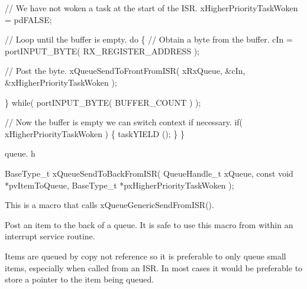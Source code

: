 \begin{DoxyPre}   // We have not woken a task at the start of the ISR.
   xHigherPriorityTaskWoken = pdFALSE;\end{DoxyPre}



\begin{DoxyPre}   // Loop until the buffer is empty.
   do
   \{
    // Obtain a byte from the buffer.
    cIn = portINPUT\_BYTE( RX\_REGISTER\_ADDRESS );\end{DoxyPre}



\begin{DoxyPre}    // Post the byte.
    xQueueSendToFrontFromISR( xRxQueue, &cIn, &xHigherPriorityTaskWoken );\end{DoxyPre}



\begin{DoxyPre}   \} while( portINPUT\_BYTE( BUFFER\_COUNT ) );\end{DoxyPre}



\begin{DoxyPre}   // Now the buffer is empty we can switch context if necessary.
   if( xHigherPriorityTaskWoken )
   \{
    taskYIELD ();
   \}
\}
\end{DoxyPre}


queue. h 
\begin{DoxyPre}
BaseType\_t xQueueSendToBackFromISR(
                                     QueueHandle\_t xQueue,
                                     const void *pvItemToQueue,
                                     BaseType\_t *pxHigherPriorityTaskWoken
                                  );
\end{DoxyPre}


This is a macro that calls x\+Queue\+Generic\+Send\+From\+I\+S\+R().

Post an item to the back of a queue. It is safe to use this macro from within an interrupt service routine.

Items are queued by copy not reference so it is preferable to only queue small items, especially when called from an I\+S\+R. In most cases it would be preferable to store a pointer to the item being queued.


